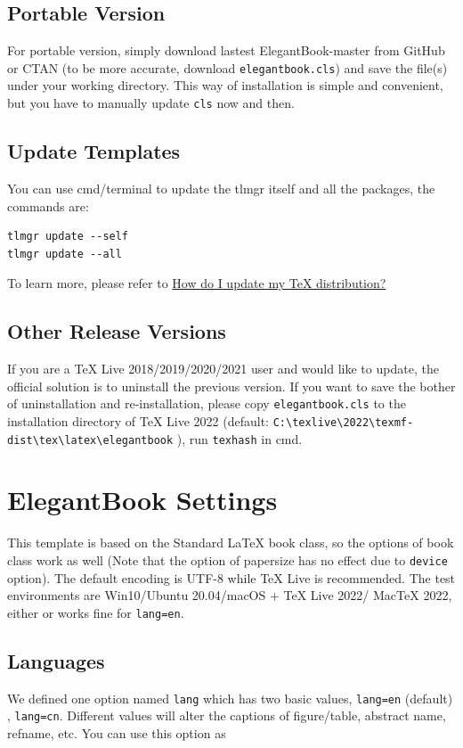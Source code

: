 \documentclass[11pt,bibend=bibtex]{elegantbook}
\begin{document}
\section{Portable Version}
For portable version, simply download lastest ElegantBook-master from GitHub or CTAN (to be more accurate, download \lstinline{elegantbook.cls}) and save the file(s) under your working directory. This way of installation is simple and convenient, but you have to manually update \lstinline{cls} now and then.


\section{Update Templates}
You can use cmd/terminal to update the tlmgr itself and all the packages, the commands are:
\begin{lstlisting}
tlmgr update --self
tlmgr update --all
\end{lstlisting}

To learn more, please refer to \href{https://tex.stackexchange.com/questions/55437/how-do-i-update-my-tex-distribution}{How do I update my \TeX{} distribution?}

\section{Other Release Versions}
If you are a \TeX{} Live 2018/2019/2020/2021 user and would like to update, the official solution is to uninstall the previous version. If you want to save the bother of uninstallation and re-installation, please copy \lstinline{elegantbook.cls} to the installation directory of \TeX{} Live 2022 (default: \lstinline|C:\texlive\2022\texmf-dist\tex\latex\elegantbook| ), run \lstinline{texhash} in cmd.

\chapter{ElegantBook Settings}
This template is based on the Standard \LaTeX{} book class, so the options of book class work as well (Note that the option of papersize has no effect due to \lstinline{device} option). The default encoding is UTF-8 while \TeX{} Live is recommended. The test environments are Win10/Ubuntu 20.04/macOS + \TeX{} Live 2022/ Mac\TeX{} 2022, either  or  works fine for \lstinline{lang=en}.

\section{Languages}
We defined one option named \lstinline{lang} which has two basic values, \lstinline{lang=en} (default) , \lstinline{lang=cn}. Different values will alter the captions of figure/table, abstract name, refname, etc. You can use this option as
\end{document}

